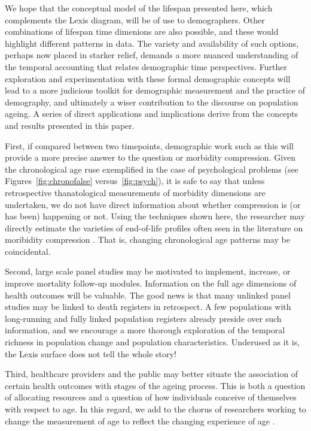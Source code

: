 \documentclass[11pt,oneside,a4paper]{article}
\begin{document}
We hope that the conceptual model of the
lifespan presented here, which complements the Lexis diagram, will be of use to
demographers. Other combinations of lifespan time dimenions are also possible,
and these would highlight different patterns in data. The variety and
availability of such options, perhaps now placed in starker relief, demands a more nuanced
understanding of the temporal accounting that relates demographic time
perspectives. Further exploration and experimentation with these formal
demographic concepts will lead to a more judicious toolkit for demographic
measurement and the practice of demography, and ultimately a wiser contribution
to the discourse on population ageing. A series of direct applications and
implications derive from the concepts and results presented in this paper. 

First, if
compared between two timepoints, demographic work such as this will
provide a more precise answer to the question or morbidity compression. Given the chronological age ruse exemplified in the case of psychological problems (see Figures~\ref{fig:chronofalse} versus~\ref{fig:psych}), it is safe to say that unless retrospective
thanatological measurements of morbidity dimensions are undertaken, we do
not have direct information about whether compression is (or has
been) happening or not. Using the techniques shown here, the researcher may
directly estimate the varieties of end-of-life profiles often seen in the
literature on moribidity compression \citep[e.g.,][]{fries2011compression}. That
is, changing chronological age patterns may be coincidental.

Second, large scale panel studies may be motivated to
implement, increase, or improve mortality follow-up modules. Information
on the full age dimensions of health outcomes will be valuable. The good news is
that many unlinked panel studies may be linked to death registers in
retrospect. A few populations with long-running and fully linked
population registers already preside over such information, and we encourage a
more thorough exploration of the temporal richness in population change and
population characteristics. Underused as it is, the Lexis surface does not tell
the whole story! 

Third, healthcare providers and the public may better situate the association of
certain health outcomes with stages of the ageing process. This is both a
question of allocating resources and a question of how individuals conceive of
themselves with respect to age. In this regard, we add to the chorus of
researchers working to change the measurement of age to reflect the changing
experience of age \citep[see e.g.,][]{sanderson2013characteristics}. 
\end{document}
